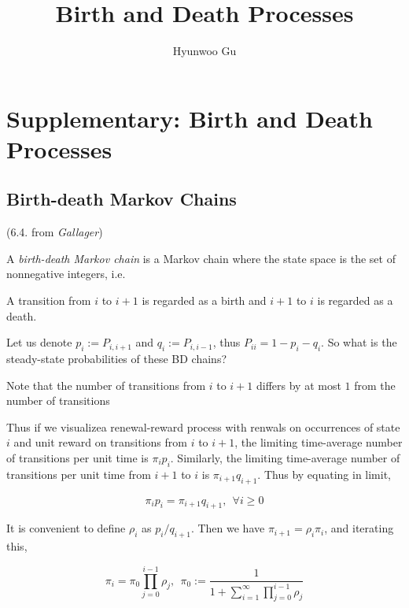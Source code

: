 \documentclass[12pt]{article}
\theoremstyle{nonumberbreak}
\begin{document}
\title{\textbf{Birth and Death Processes}}
\author{Hyunwoo Gu}
\date{}

\maketitle

\section*{Supplementary: Birth and Death Processes}
\setcounter{section}{0}


\subsection{Birth-death Markov Chains}(6.4. from \textit{Gallager})

A \textit{birth-death Markov chain} is a Markov chain where the state space is the set of nonnegative integers, i.e.



A transition from $i$ to $i+1$ is regarded as a birth and $i+1$ to $i$ is regarded as a death. 



Let us denote $p_i := P_{i,i+1}$ and $q_i := P_{i,i-1}$, thus $P_{ii} = 1 - p_i - q_i$. So what is the steady-state probabilities of these BD chains?

Note that the number of transitions from $i$ to $i+1$ differs by at most $1$ from the number of transitions 



Thus if we visualizea renewal-reward process with renwals on occurrences of state $i$ and unit reward on transitions from $i$ to $i+1$, the limiting time-average number of transitions per unit time is $\pi_i p_i$. Similarly, the limiting time-average number of transitions per unit time from $i+1$ to $i$ is $\pi_{i+1} q_{i+1}$. Thus by equating in limit,

$$
\pi_i p_i = \pi_{i+1} q_{i+1}, \ \ \forall i\ge 0
$$



It is convenient to define $\rho_i$ as $p_i / q_{i+1}$. Then we have $\pi_{i+1} = \rho_i \pi_i$, and iterating this,

$$
\pi_i = \pi_0 \prod_{j=0}^{i-1} \rho_j, \ \ \pi_0 := \frac{1}{1 + \sum_{i=1}^\infty \prod_{j=0}^{i-1} \rho_j}
$$
\end{document}
